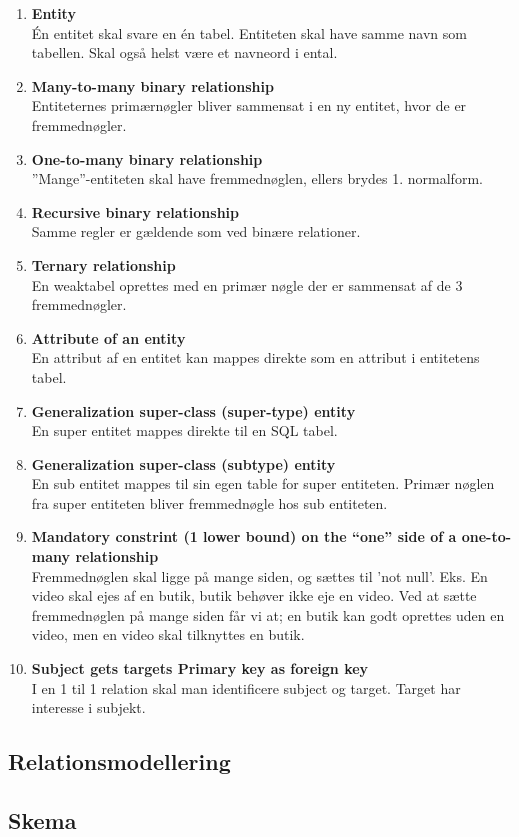 \begin{enumerate}
	\item \textbf{Entity}\\
	Én entitet skal svare en én tabel. Entiteten skal have samme navn som tabellen. Skal også helst være et navneord i ental. 
	
	\item \textbf{Many-to-many binary relationship}\\
	Entiteternes primærnøgler bliver sammensat i en ny entitet, hvor de er fremmednøgler.
	
	\item \textbf{One-to-many binary relationship}\\
	''Mange''-entiteten skal have fremmednøglen, ellers brydes 1. normalform.
	
	\item \textbf{Recursive binary relationship}\\
	Samme regler er gældende som ved binære relationer.
	
	\item \textbf{Ternary relationship}\\
	En weaktabel oprettes med en primær nøgle der er sammensat af de 3 fremmednøgler.
	
	\item \textbf{Attribute of an entity}\\
	En attribut af en entitet kan mappes direkte som en attribut i entitetens tabel.
	
	\item \textbf{Generalization super-class (super-type) entity}\\
	En super entitet mappes direkte til en SQL tabel.
	
	\item \textbf{Generalization super-class (subtype) entity}\\
	En sub entitet mappes til sin egen table for super entiteten. Primær nøglen fra super entiteten
	bliver fremmednøgle hos sub entiteten.
	
	\item \textbf{Mandatory constrint (1 lower bound) on the “one” side of a one-to-many relationship}\\
	Fremmednøglen skal ligge på mange siden, og sættes til ’not null’. Eks. En video skal ejes af en
	butik, butik behøver ikke eje en video. Ved at sætte fremmednøglen på mange siden får vi at; en
	butik kan godt oprettes uden en video, men en video skal tilknyttes en butik.
	
	\item \textbf{Subject gets targets Primary key as foreign key}\\
	I en 1 til 1 relation skal man identificere subject og target. Target har interesse i subjekt.
	
\end{enumerate}

\subsection{Relationsmodellering}

\subsection{Skema}